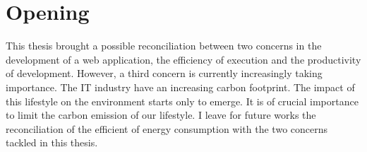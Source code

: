 \section{Opening}

This thesis brought a possible reconciliation between two concerns in the development of a web application, the efficiency of execution and the productivity of development.
However, a third concern is currently increasingly taking importance.
The IT industry have an increasing carbon footprint.
The impact of this lifestyle on the environment starts only to emerge.
It is of crucial importance to limit the carbon emission of our lifestyle.
I leave for future works the reconciliation of the efficient of energy consumption with the two concerns tackled in this thesis.